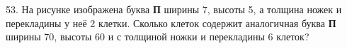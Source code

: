 53. На рисунке изображена буква {\bf П} ширины 7, высоты 5, а толщина ножек и перекладины у неё 2 клетки. Сколько клеток содержит аналогичная буква {\bf П} ширины 70, высоты 60 и с толщиной ножки и перекладины 6 клеток?
\begin{center}
\begin{figure}[ht!]
\end{figure}
\end{center}
